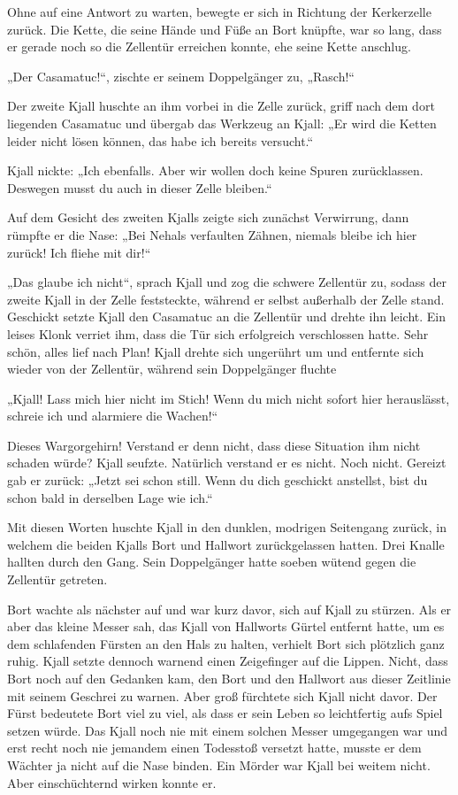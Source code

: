 Ohne auf eine Antwort zu warten, bewegte er sich in Richtung der Kerkerzelle zurück. Die Kette, die seine Hände und Füße an Bort knüpfte, war so lang, dass er gerade noch so die Zellentür erreichen konnte, ehe seine Kette anschlug.

„Der Casamatuc!“, zischte er seinem Doppelgänger zu, „Rasch!“

Der zweite Kjall huschte an ihm vorbei in die Zelle zurück, griff nach dem dort liegenden Casamatuc und übergab das Werkzeug an Kjall: „Er wird die Ketten leider nicht lösen können, das habe ich bereits versucht.“

Kjall nickte: „Ich ebenfalls. Aber wir wollen doch keine Spuren zurücklassen. Deswegen musst du auch in dieser Zelle bleiben.“

Auf dem Gesicht des zweiten Kjalls zeigte sich zunächst Verwirrung, dann rümpfte er die Nase: „Bei Nehals verfaulten Zähnen, niemals bleibe ich hier zurück! Ich fliehe mit dir!“

„Das glaube ich nicht“, sprach Kjall und zog die schwere Zellentür zu, sodass der zweite Kjall in der Zelle feststeckte, während er selbst außerhalb der Zelle stand. Geschickt setzte Kjall den Casamatuc an die Zellentür und drehte ihn leicht. Ein leises Klonk verriet ihm, dass die Tür sich erfolgreich verschlossen hatte. Sehr schön, alles lief nach Plan! Kjall drehte sich ungerührt um und entfernte sich wieder von der Zellentür, während sein Doppelgänger fluchte

„Kjall! Lass mich hier nicht im Stich! Wenn du mich nicht sofort hier herauslässt, schreie ich und alarmiere die Wachen!“

Dieses Wargorgehirn! Verstand er denn nicht, dass diese Situation ihm nicht schaden würde? Kjall seufzte. Natürlich verstand er es nicht. Noch nicht. Gereizt gab er zurück: „Jetzt sei schon still. Wenn du dich geschickt anstellst, bist du schon bald in derselben Lage wie ich.“

Mit diesen Worten huschte Kjall in den dunklen, modrigen Seitengang zurück, in welchem die beiden Kjalls Bort und Hallwort zurückgelassen hatten. Drei Knalle hallten durch den Gang. Sein Doppelgänger hatte soeben wütend gegen die Zellentür getreten.



\trennzeichen



Bort wachte als nächster auf und war kurz davor, sich auf Kjall zu stürzen. Als er aber das kleine Messer sah, das Kjall von Hallworts Gürtel entfernt hatte, um es dem schlafenden Fürsten an den Hals zu halten, verhielt Bort sich plötzlich ganz ruhig. Kjall setzte dennoch warnend einen Zeigefinger auf die Lippen. Nicht, dass Bort noch auf den Gedanken kam, den Bort und den Hallwort aus dieser Zeitlinie mit seinem Geschrei zu warnen. Aber groß fürchtete sich Kjall nicht davor. Der Fürst bedeutete Bort viel zu viel, als dass er sein Leben so leichtfertig aufs Spiel setzen würde. Das Kjall noch nie mit einem solchen Messer umgegangen war und erst recht noch nie jemandem einen Todesstoß versetzt hatte, musste er dem Wächter ja nicht auf die Nase binden. Ein Mörder war Kjall bei weitem nicht. Aber einschüchternd wirken konnte er.

